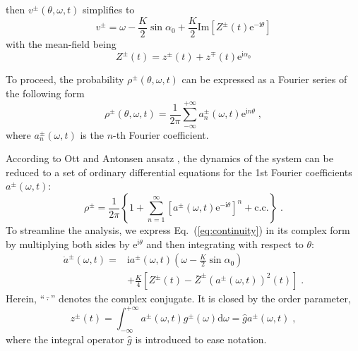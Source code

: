 \documentclass{article}
\begin{document}
then $v^{\pm}\left( \theta ,\omega ,t \right)$ simplifies to
\begin{equation}
v^{\pm}=\omega -\frac{K}{2}\sin \alpha _0+\frac{K}{2}\mathrm{Im}\left[ Z^{\pm}\left( t \right) \mathrm{e}^{-\mathrm{i}\theta} \right] 
\end{equation}
with the mean-field being
\begin{equation}
    Z^{\pm}\left( t \right) =z^{\pm}\left( t \right) +z^{\mp}\left( t \right) \mathrm{e}^{\mathrm{i}\alpha _0}
\end{equation}

To proceed, the probability $\rho ^{\pm}\left( \theta ,\omega ,t \right)$ can be expressed as a Fourier series of the following form
\begin{equation}
    \rho ^{\pm}\left( \theta ,\omega ,t \right) =\frac{1}{2\pi}\sum_{-\infty}^{+\infty}{a^{\pm} _n\left( \omega ,t \right) \mathrm{e}^{\mathrm{i}n\theta}}\;,
\end{equation}
where $a^{\pm} _n\left( \omega ,t \right)$ is the $n$-th Fourier coefficient.

According to Ott and Antonsen ansatz \cite{10.1063/1.2930766, 10.1063/1.3136851}, the dynamics of the system can be reduced to a set of ordinary differential equations for the 1st Fourier coefficients $a^{\pm}\left( \omega ,t \right)$:
\begin{equation}
    \rho ^{\pm}=\frac{1}{2\pi}\left\{ 1+\sum_{n=1}^{\infty}{\left[ a^{\pm} \left( \omega ,t \right) \mathrm{e}^{-\mathrm{i}\theta} \right] ^n+\mathrm{c}.\mathrm{c}.} \right\} \;.
\end{equation}
To streamline the analysis, we express Eq.~(\ref{eq:continuity}) in its complex form by multiplying both sides by $\mathrm{e}^{\mathrm{i}\theta}$ and then integrating with respect to $\theta$:
\begin{equation}
    \label{eq:aDynamics}
    \begin{aligned}
        \dot{a}^{\pm}\left( \omega ,t \right) =&\mathrm{i}a^{\pm}\left( \omega ,t \right) \left( \omega -\frac{K}{2}\sin \alpha _0 \right)\\
        &+\frac{K}{4}\left[ Z^{\pm}\left( t \right) -\bar{Z}^{\pm}\left( a^{\pm}\left( \omega ,t \right) \right) ^2\left( t \right) \right] \;.
    \end{aligned}
\end{equation}
Herein, \enquote{$\bar{\cdot}$} denotes the complex conjugate.
It is closed by the order parameter,
\begin{equation}
    \label{eq:zEqs2a}
    z^{\pm}\left( t \right) =\int_{-\infty}^{+\infty}{a^{\pm}\left( \omega ,t \right) g^{\pm}\left( \omega \right) \mathrm{d}\omega =}\hat{g}a^{\pm} \left( \omega ,t \right)\;,
\end{equation}
where the integral operator $\hat{g}$ is introduced to ease notation.
\end{document}
